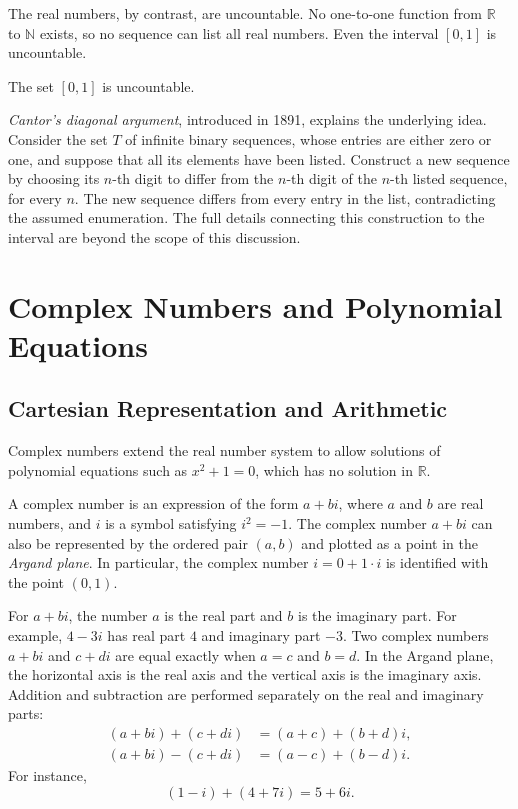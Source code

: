 The real numbers, by contrast, are uncountable. No one-to-one function from $\mathbb{R}$ to $\mathbb{N}$ exists, so no sequence can list all real numbers.
Even the interval $[0,1]$ is uncountable.

\begin{theorem}
The set $[0,1]$ is uncountable.
\end{theorem}

\textit{Cantor's diagonal argument}, introduced in 1891, explains the underlying idea.
Consider the set $T$ of infinite binary sequences, whose entries are either zero or one, and suppose that all its elements have been listed.
Construct a new sequence by choosing its $n$-th digit to differ from the $n$-th digit of the $n$-th listed sequence, for every $n$.
The new sequence differs from every entry in the list, contradicting the assumed enumeration.
The full details connecting this construction to the interval are beyond the scope of this discussion.

\section{Complex Numbers and Polynomial Equations}

\subsection{Cartesian Representation and Arithmetic}

Complex numbers extend the real number system to allow solutions of polynomial equations such as $x^2 + 1 = 0$, which has no solution in $\mathbb{R}$.

\begin{definition}
A complex number is an expression of the form $a + bi$, where $a$ and $b$ are real numbers, and $i$ is a symbol satisfying $i^2 = -1$. The complex
number $a+bi$ can also be represented by the ordered pair $(a,b)$ and plotted as a point in the \emph{Argand plane}.
In particular, the complex number $i = 0 + 1 \cdot i$ is identified with the point $(0,1)$.
\end{definition}

For $a+bi$, the number $a$ is the real part and $b$ is the imaginary part. For example, $4 - 3i$ has real part $4$ and imaginary part $-3$.
Two complex numbers $a+bi$ and $c+di$ are equal exactly when $a = c$ and $b = d$.
In the Argand plane, the horizontal axis is the real axis and the vertical axis is the imaginary axis. Addition and subtraction are performed separately on the real and imaginary parts:
\[
\begin{aligned}
(a+bi) + (c+di) &= (a+c) + (b+d)i, \\
(a+bi) - (c+di) &= (a-c) + (b-d)i.
\end{aligned}
\]
For instance,
\[
(1-i) + (4+7i) = 5 + 6i.
\]

